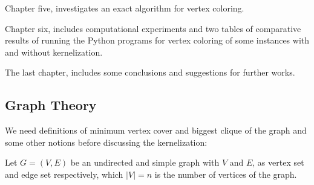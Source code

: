 \documentclass{beamer}
\begin{document}
Chapter five, investigates an exact algorithm for vertex coloring.

Chapter six, includes computational experiments and two tables of comparative results of running the Python programs for vertex coloring of some instances with and without kernelization.

The last chapter, includes some conclusions and suggestions for further works.

\newpage
\subsection{Graph Theory}
We need definitions of minimum vertex cover and biggest clique of the graph and some other notions before discussing the kernelization:


Let $G = (V, E)$ be an undirected and simple graph with $V$ and $E$, as vertex set and edge set respectively, which $|V| = n$ is the number of vertices of the graph.
\end{document}
